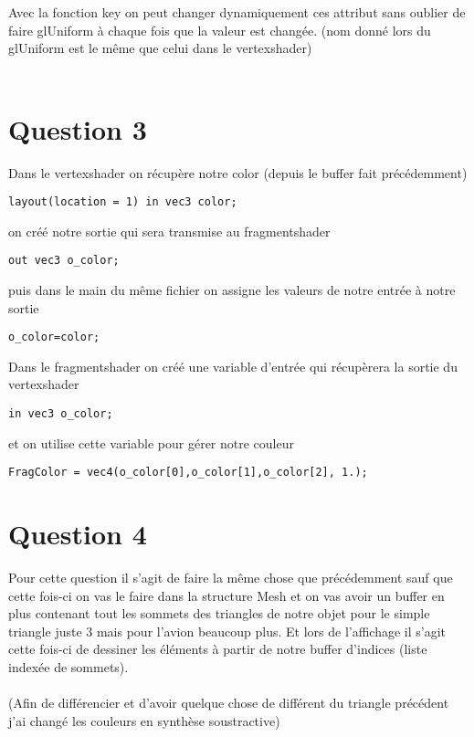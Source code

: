 \documentclass{article}
\begin{document}
Avec la fonction key on peut changer dynamiquement ces attribut sans oublier de faire glUniform à chaque fois que la valeur est changée. (nom donné lors du glUniform est le même que celui dans le vertexshader)
\\\\
\newpage
\section{Question 3}

Dans le vertexshader on récupère notre color (depuis le buffer fait précédemment)
\begin{lstlisting}
layout(location = 1) in vec3 color;
\end{lstlisting}

on créé notre sortie qui sera transmise au fragmentshader
\begin{lstlisting}
out vec3 o_color;
\end{lstlisting}

puis dans le main du même fichier on assigne les valeurs de notre entrée à notre sortie
\begin{lstlisting}
o_color=color;
\end{lstlisting}

Dans le fragmentshader on créé une variable d’entrée qui récupèrera la sortie du vertexshader 
\begin{lstlisting}
in vec3 o_color;
\end{lstlisting}

et on utilise cette variable pour gérer notre couleur
\begin{lstlisting}
FragColor = vec4(o_color[0],o_color[1],o_color[2], 1.);
\end{lstlisting}


\section{Question 4}
Pour cette question il s'agit de faire la même chose que précédemment sauf que cette fois-ci on vas le faire dans la structure Mesh et on vas avoir un buffer en plus contenant tout les sommets des triangles de notre objet pour le simple triangle juste 3 mais pour l'avion beaucoup plus.
Et lors de l'affichage il s'agit cette fois-ci de dessiner les éléments à partir de notre buffer d'indices (liste indexée de sommets).
\\\\
(Afin de différencier et d'avoir quelque chose de différent du triangle précédent j'ai changé les couleurs en synthèse soustractive)
\\\\
\end{document}
